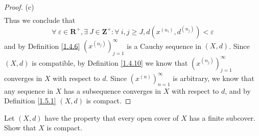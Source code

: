 \begin{proof}{(c)}
\begin{align*}
    \end{align*}
    Thus we conclude that
    \[
        \forall\ \varepsilon \in \mathbf{R}^+, \exists\ J \in \mathbf{Z}^+ : \forall\ i, j \geq J, d(x^{(n_i)}, d^{(n_j)}) < \varepsilon
    \]
    and by Definition \ref{1.4.6} \((x^{(n_j)})_{j = 1}^\infty\) is a Cauchy sequence in \((X, d)\).
    Since \((X, d)\) is compatible, by Definition \ref{1.4.10} we know that \((x^{(n_j)})_{j = 1}^\infty\) converges in \(X\) with respect to \(d\).
    Since \((x^{(n)})_{n = 1}^\infty\) is arbitrary, we know that any sequence in \(X\) has a subsequence converges in \(X\) with respect to \(d\), and by Definition \ref{1.5.1} \((X, d)\) is compact.
\end{proof}

\begin{exercise}\label{ex 1.5.11}
    Let \((X, d)\) have the property that every open cover of \(X\) has a finite subcover.
    Show that \(X\) is compact.
\end{exercise}

